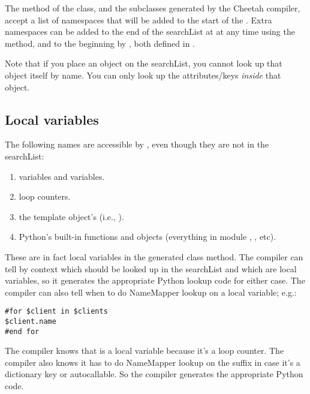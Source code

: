 The method of the  class, and the subclasses
generated by the Cheetah compiler, accept a list of namespaces that will be
added to the start of the .  Extra namespaces can be added to
the end of the searchList at at any time using the
 method, and to the beginning by
, both defined in .

Note that if you place an object on the searchList, you cannot look up that
object itself by name.  You can only look up the attributes/keys {\em inside}
that object.



\subsection{Local variables}
\label{language.localVariables}

The following names are accessible by , even though they
are not in the searchList:  

\begin{enumerate}
\item {} variables and  variables.
\item {} loop counters.
\item the template object's  (i.e., ).
\item Python's built-in functions and objects (everything in module
     , , etc).
\end{enumerate}

These are in fact local variables in the generated class method.  The compiler
can tell by context which  should be looked up in the
searchList and which are local variables, so it generates the appropriate
Python lookup code for either case.  The compiler can also tell when to do
NameMapper lookup on a local variable; e.g.:
\begin{verbatim}
#for $client in $clients 
$client.name
#end for
\end{verbatim}
The compiler knows that  is a local variable because it's a
 loop counter.  The compiler also knows it has to do NameMapper
lookup on the  suffix in case it's a dictionary key or 
autocallable.  So the compiler generates the appropriate Python code.

